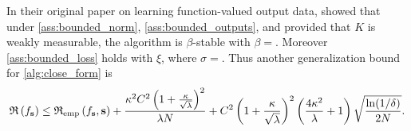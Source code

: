 In their original paper on learning function-valued output data,
\citet{kadri2015operator} showed that under \cref{ass:bounded_norm},
\cref{ass:bounded_outputs}, and provided that $K$ is weakly measurable, the
algorithm is $\beta$-stable with $\beta=$. Moreover \cref{ass:bounded_loss}
holds with $\xi$, where $\sigma=$.  Thus another generalization bound for
\cref{alg:close_form} is
\begin{dmath}
    \risk{f_{\seq{s}}} \le \riskemp{f_{\seq{s}}, \seq{s}}  + \frac{\kappa^2 C^2
    \left(1 + \frac{\kappa}{\sqrt{\lambda}} \right)^2 }{\lambda N} + C^2\left(
    1 + \frac{\kappa}{\sqrt{\lambda}} \right)^2\left( \frac{4\kappa^2}{\lambda}
    + 1 \right)\sqrt{\frac{\ln(1/\delta)}{2N}}.
\end{dmath}

